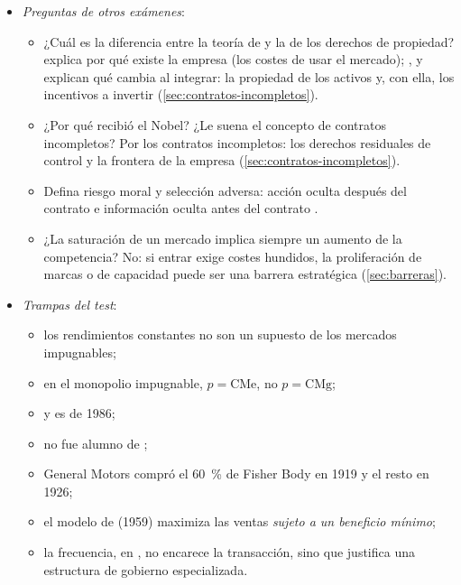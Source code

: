 \documentclass[11pt]{article}
\begin{document}
\begin{itemize}
\item \emph{Preguntas de otros exámenes}:
  \begin{itemize}
  \item ¿Cuál es la diferencia entre la teoría de  y la de los derechos de propiedad?  explica por qué existe la empresa (los costes de usar el mercado); ,  y  explican qué cambia al integrar: la propiedad de los activos y, con ella, los incentivos a invertir (\ref{sec:contratos-incompletos}).
  \item ¿Por qué recibió  el Nobel? ¿Le suena el concepto de contratos incompletos? Por los contratos incompletos: los derechos residuales de control y la frontera de la empresa (\ref{sec:contratos-incompletos}).
  \item Defina riesgo moral y selección adversa: acción oculta después del contrato e información oculta antes del contrato .
  \item ¿La saturación de un mercado implica siempre un aumento de la competencia? No: si entrar exige costes hundidos, la proliferación de marcas o de capacidad puede ser una barrera estratégica (\ref{sec:barreras}).
  \end{itemize}
\item \emph{Trampas del test}:
  \begin{itemize}
  \item los rendimientos constantes no son un supuesto de los mercados impugnables;
  \item en el monopolio impugnable, $p=\mathrm{CMe}$, no $p=\mathrm{CMg}$;
  \item {} y  es de 1986;
  \item {} no fue alumno de ;
  \item General Motors compró el 60~\% de Fisher Body en 1919 y el resto en 1926;
  \item el modelo de  (1959) maximiza las ventas \emph{sujeto a un beneficio mínimo};
  \item la frecuencia, en , no encarece la transacción, sino que justifica una estructura de gobierno especializada.
  \end{itemize}
\end{itemize}

\bibliografia
\end{document}
